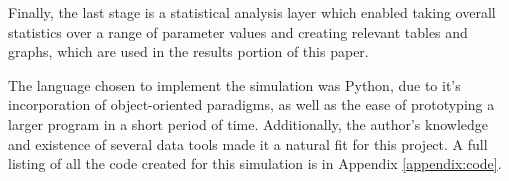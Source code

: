 Finally, the last stage is a statistical analysis layer which enabled taking overall
statistics over a range of parameter values and creating relevant tables and graphs,
which are used in the results portion of this paper.

The language chosen to implement the simulation was Python, due to it's incorporation of 
object-oriented paradigms, as well as the ease of prototyping a larger program in a 
short period of time.
Additionally, the author's knowledge and existence of several data tools made it a natural
fit for this project.
A full listing of all the code created for this simulation is in Appendix \ref{appendix:code}.
